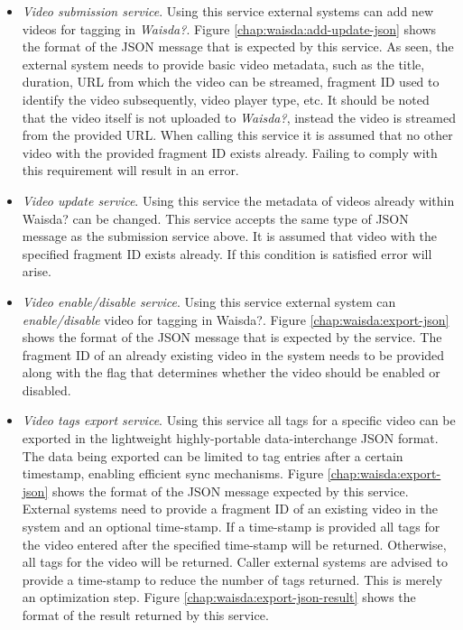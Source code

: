 \begin{itemize}
\item \textit{Video submission service}. Using this service external systems can add new videos for tagging in \textit{Waisda?}. Figure \ref{chap:waisda:add-update-json} shows the format of the JSON message that is expected by this service. As seen, the external system needs to provide basic video metadata, such as the title, duration, URL from which the video can be streamed, fragment ID used to identify the video subsequently, video player type, etc. It should be noted that the video itself is not uploaded to \textit{Waisda?}, instead the video is streamed from the provided URL. When calling this service it is assumed that no other video with the provided fragment ID exists already. Failing to comply with this requirement will result in an error.

\item \textit{Video update service}. Using this service the metadata of videos already within Waisda? can be changed. This service accepts the same type of JSON message as the submission service above. It is assumed that video with the specified fragment ID exists already. If this condition is satisfied error will arise.

\item \textit{Video enable/disable service}. Using this service external system can \textit{enable/disable} video for tagging in Waisda?. Figure \ref{chap:waisda:export-json} shows the format of the JSON message that is expected by the service. The fragment ID of an already existing video in the system needs to be provided along with the flag that determines whether the video should be enabled or disabled.

\item \textit{Video tags export service}. Using this service all tags for a specific video can be exported in the lightweight highly-portable data-interchange JSON format. The data being exported can be limited to tag entries after a certain timestamp, enabling efficient sync mechanisms. Figure \ref{chap:waisda:export-json} shows the format of the JSON message expected by this service. External systems need to provide a fragment ID of an existing video in the system and an optional time-stamp. If a time-stamp is provided all tags for the video entered after the specified time-stamp will be returned. Otherwise, all tags for the video will be returned. Caller external systems are advised to provide a time-stamp to reduce the number of tags returned. This is merely an optimization step. Figure \ref{chap:waisda:export-json-result} shows the format of the result returned by this service.
\end{itemize}

